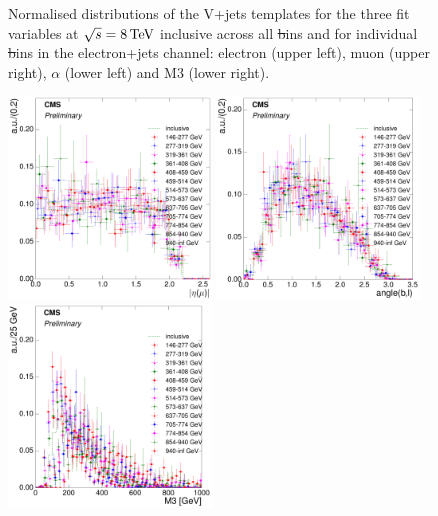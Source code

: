 \begin{figure}[hbtp]
	 \caption{Normalised distributions of the V+jets templates for the three fit variables at $\sqrt{s}=8\,\text{Te\hspace{-.08em}V}$
	 inclusive across all \st bins and for individual \st bins in the electron+jets channel: electron \abseta
	 (upper left), muon \abseta (upper right), $\alpha$ (lower left) and M3 (lower right).}
     \label{fig:ST_fit_variable_vjets_comparisons_8TeV}
\end{figure}

\begin{figure}[hbtp]
    \centering
     \includegraphics[width=0.48\textwidth]{Chapters/04_Analysis/04b_XSections/images/8TeV/fit_variables/muon/ST/muon_absolute_eta/vjets/ST_muon_absolute_eta_2orMoreBtags_VJets_template_comparison.pdf}\hfill
     \includegraphics[width=0.48\textwidth]{Chapters/04_Analysis/04b_XSections/images/8TeV/fit_variables/muon/ST/angle_bl/vjets/ST_angle_bl_2orMoreBtags_VJets_template_comparison.pdf}\hfill
     \includegraphics[width=0.48\textwidth]{Chapters/04_Analysis/04b_XSections/images/8TeV/fit_variables/muon/ST/M3/vjets/ST_M3_2orMoreBtags_VJets_template_comparison.pdf}\\

\end{figure}
